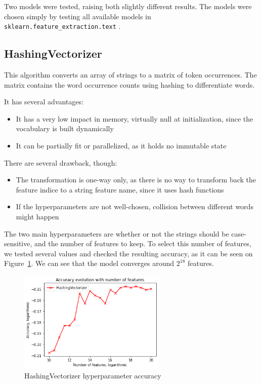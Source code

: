 \documentclass[11pt]{article}
\begin{document}
Two models were tested, raising both slightly different results.
The models were chosen simply by testing all available models in \texttt{sklearn.feature\_extraction.text} .

\subsection{HashingVectorizer}

This algorithm converts an array of strings to a matrix of token occurrences.
The matrix contains the word occurrence counts using hashing to differentiate words.

It has several advantages:
\begin{itemize}
\item It has a very low impact in memory, virtually null at initialization,
since the vocabulary is built dynamically
\item It can be partially fit or parallelized, as it holds no immutable state
\end{itemize}

There are several drawback, though:
\begin{itemize}
\item The transformation is one-way only, as there is no way to transform back the feature indice
to a string feature name, since it uses hash functions
\item If the hyperparameters are not well-chosen, collision between different words might happen
\end{itemize}

The two main hyperparameters are whether or not the strings should be case-sensitive,
and the number of features to keep.
To select this number of features, we tested several values and checked the resulting accuracy,
as it can be seen on Figure~\ref{fig:hash_accuracy}. We can see that the model converges
around $2^{18}$ features.

\begin{figure}[htb]
\begin{center}
\includegraphics[width=70mm]{data/n_features_hash.png}
\end{center}
\caption{HashingVectorizer hyperparameter accuracy}
\label{fig:hash_accuracy}
\end{figure}
\end{document}
